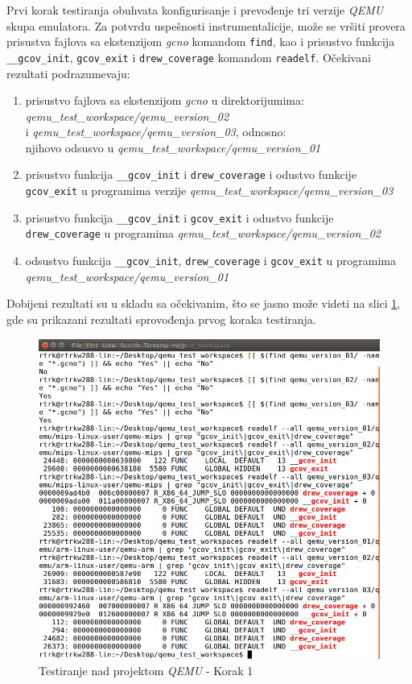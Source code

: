 \documentclass[12pt,oneside]{memoir}
\newcommand{\kod}[1]{\texttt{#1}}
\newcommand{\strano}[1]{\textit{#1}}
\begin{document}
Prvi korak testiranja obuhvata konfigurisanje i prevođenje tri verzije \strano{QEMU} skupa emulatora. Za  potvrdu uspešnosti instrumentalicije, može se vršiti provera prisustva fajlova sa ekstenzijom \strano{gcno} komandom \kod{find}, kao i prisustvo funkcija  \kod{\_\_gcov\_init}, \kod{gcov\_exit} i \kod{drew\_coverage} komandom \kod{readelf}. Očekivani rezultati podrazumevaju:
\begin{enumerate}
\item prisustvo fajlova sa ekstenzijom \strano{gcno} u direktorijumima: \\ \strano{qemu\_test\_workspace/qemu\_version\_02} \\ i \strano{qemu\_test\_workspace/qemu\_version\_03}, odnosno: \\ njihovo odsusvo u \strano{qemu\_test\_workspace/qemu\_version\_01}
\item prisustvo funkcija \kod{\_\_gcov\_init} i \kod{drew\_coverage} i odustvo funkcije \kod{gcov\_exit} u programima verzije \strano{qemu\_test\_workspace/qemu\_version\_03}
\item prisustvo funkcija \kod{\_\_gcov\_init} i \kod{gcov\_exit} i odustvo funkcije \kod{drew\_coverage} u programima  \strano{qemu\_test\_workspace/qemu\_version\_02}
\item odsustvo funkcija \kod{\_\_gcov\_init}, \kod{drew\_coverage} i \kod{gcov\_exit} u programima \strano{qemu\_test\_workspace/qemu\_version\_01}
\end{enumerate}
Dobijeni rezultati su u skladu sa očekivanim, što se jasno može videti na slici \ref{fig:qemu-test-1}, gde su prikazani rezultati sprovođenja prvog koraka testiranja.  

\begin{figure}[!ht]
  \centering
  \label{fig:qemu-test-1}
  \includegraphics[width=\textwidth]{img/qemu-test-1-ng.png}
  \caption{Testiranje nad projektom \strano{QEMU} - Korak 1}
\end{figure} 
\end{document}
